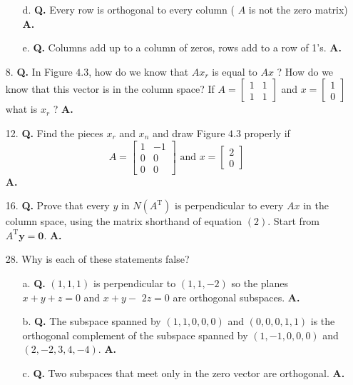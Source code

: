 \documentclass[main.tex]{subfiles}
\begin{document}
\begin{enumerate}
\begin{enumerate}
        \item [d.] \textbf{Q.} Every row is orthogonal to every column ( $A$ is not the zero matrix) \textbf{A.}
        
        \item [e.] \textbf{Q.} Columns add up to a column of zeros, rows add to a row of 1's. \textbf{A.}
        
    \end{enumerate}
    
    \item [8.] \textbf{Q.} In Figure $4.3$, how do we know that $A x_{r}$ is equal to $A x$ ? How do we know that this vector is in the column space? If $A=\left[\begin{array}{ll}1 & 1 \\ 1 & 1\end{array}\right]$ and $x=\left[\begin{array}{l}1 \\ 0\end{array}\right]$ what is $x_{r}$ ? \textbf{A.}
    
    \item [12.] \textbf{Q.} Find the pieces $x_{r}$ and $x_{n}$ and draw Figure $4.3$ properly if
    $$
    A=\left[\begin{array}{rr}
    1 & -1 \\
    0 & 0 \\
    0 & 0
    \end{array}\right] \text { and } x=\left[\begin{array}{l}
    2 \\
    0
    \end{array}\right]
    $$
    \textbf{A.}
    
    \item [16.] \textbf{Q.} Prove that every $y$ in $N\left(A^{\mathrm{T}}\right)$ is perpendicular to every $A x$ in the column space, using the matrix shorthand of equation $(2)$. Start from $A^{\mathrm{T}} \boldsymbol{y}=\mathbf{0}$. \textbf{A.}
    
    \item [28.] Why is each of these statements false?
    \begin{enumerate}
        \item [a.] \textbf{Q.} $(1,1,1)$ is perpendicular to $(1,1,-2)$ so the planes $x+y+z=0$ and $x+y-$ $2 z=0$ are orthogonal subspaces. \textbf{A.}
        
        \item [b.] \textbf{Q.} The subspace spanned by $(1,1,0,0,0)$ and $(0,0,0,1,1)$ is the orthogonal complement of the subspace spanned by $(1,-1,0,0,0)$ and $(2,-2,3,4,-4)$. \textbf{A.}
        
        \item [c.] \textbf{Q.} Two subspaces that meet only in the zero vector are orthogonal. \textbf{A.}
        
    \end{enumerate}
\end{enumerate}
\end{document}
